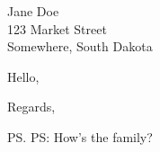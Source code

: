 \documentclass[letter,12pt]{letter}
\begin{document}
\begin{letter}{Jane Doe \\ 123 Market Street \\ Somewhere, South Dakota}

\opening{Hello,} %

\lipsum[1]

\closing{Regards,} %
\ps{PS: How's the family?} %

\end{letter}
\end{document}
